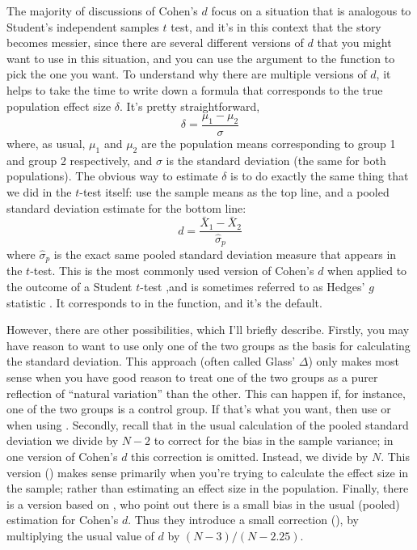 The majority of discussions of Cohen's $d$ focus on a situation that is analogous to Student's independent samples $t$ test, and it's in this context that the story becomes messier, since there are several different versions of $d$ that you might want to use in this situation, and you can use the  argument to the  function to pick the one you want. To understand why there are multiple versions of $d$, it helps to take the time to write down a formula that corresponds to the true population effect size $\delta$. It's pretty straightforward, 
$$
\delta = \frac{\mu_1 - \mu_2}{\sigma}
$$
where, as usual, $\mu_1$ and $\mu_2$ are the population means corresponding to group 1 and group 2 respectively, and $\sigma$ is the standard deviation (the same for both populations). The obvious way to estimate $\delta$ is to do exactly the same thing that we did in the $t$-test itself: use the sample means as the top line, and a pooled standard deviation estimate for the bottom line:
$$
d = \frac{\bar{X}_1 - \bar{X}_2}{\hat{\sigma}_p}
$$
where $\hat\sigma_p$ is the exact same pooled standard deviation measure that appears in the $t$-test. This is the most commonly used version of Cohen's $d$ when applied to the outcome of a Student $t$-test ,and is sometimes referred to as Hedges' $g$ statistic \cite{Hedges1981}. It corresponds to  in the  function, and it's the default. 

However, there are other possibilities, which I'll briefly describe. Firstly, you may have reason to want to use only one of the two groups as the basis for calculating the standard deviation. This approach (often called Glass' $\Delta$) only makes most sense when you have good reason to treat one of the two groups as a purer reflection of ``natural variation'' than the other. This can happen if, for instance, one of the two groups is a control group. If that's what you want, then use  or  when using . Secondly, recall that in the usual calculation of the pooled standard deviation we divide by $N-2$ to correct for the bias in the sample variance; in one version of Cohen's $d$ this correction is omitted. Instead, we divide by $N$. This version () makes sense primarily when you're trying to calculate the effect size in the sample; rather than estimating an effect size in the population. Finally, there is a version based on , who point out there is a small bias in the usual (pooled) estimation for Cohen's $d$. Thus they introduce a small correction (), by multiplying the usual value of $d$ by $(N-3)/(N-2.25)$. 

